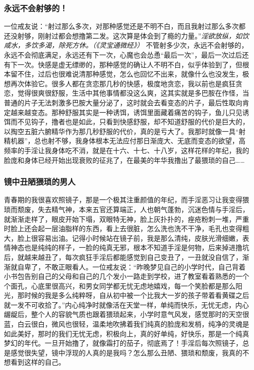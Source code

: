 \subsubsection{永远不会射够的！}

一位戒友说：“射过那么多次，对那种感觉还是不明不白，而且我射过那么多次都还没射够，刚射过都会想撸第二发。这次算是体会到了瘾的力量。”\textit{淫欲放纵，如饮咸水，多饮多渴，除死方休。（《灵宝通微经》）} 不管射多少次，永远不会射够的，永远不会彻底满足，永远还有下一次，心魔也会怂恿“最后一次”，最后一次过后还有下一次。快感是虚无缥缈的，那种感觉的确让人不明不白，似乎体验到了，但根本留不住，过后也很难说清那种感觉，怎么也回忆不出来，就像什么也没发生，极想再次体验它。很多人都在贪恋那几秒的快感，极度地贪恋，我以前也是疯狂贪恋，觉得很爽很舒服，生活中其他事情都没这么爽，这其实就是多巴胺在作怪，当普通的片子无法刺激多巴胺大量分泌了，这时就会去看变态的片子，最后性取向肯定越来越变态。那种舒服其实是一种诱饵，诱饵里面藏着痛苦的钩子，鱼儿只见诱饵而不见钩子，撸者也是如此，只看到快感舒服，却不知道舒服的代价是巨大的，以掏空五脏六腑精华作为那几秒舒服的代价，真的是亏大了。我那时就像一具“射精机器”，总也射不够，我身体根本无法应付那日渐庞大、无底而变态的欲望，高频率的手淫让我身体吃不消，就是在十六、十七、十八岁，这样花样的年纪，我的脸庞和身体已经开始出现衰败的征兆了，在最美的年华我撸出了最猥琐的自己……

\subsubsection{镜中丑陋猥琐的男人}

青春期的我很喜欢照镜子，那是一个极其注重颜值的年纪，而手淫恶习让我变得猥琐而颓废，失去精气神，本来五官还算端正，人也朝气蓬勃，沉迷色情与手淫后，就渐渐走样了，眼皮开始下塌，双眼特无神，脸上灰扑扑的，痤疮粉刺一堆，严重时脸上还会起一层油脂样的东西，看上去很脏，怎么洗也洗不干净，毛孔也变得粗大，脸上很容易出油。记得小时候站在镜子前，我是那么清纯，皮肤光滑细嫩，表情神态也是纯纯的样子，一脸的纯真无邪，根本不知道手淫是何物，后来掉进撸坑后，就越来越丑了，每次疯狂手淫后都能感觉到自己变丑了，一丑就没自信了，渐渐就自卑了，不敢正眼看人。一位戒友说：“昨晚梦见自己的小学时代，自己背着小书包告别自己的父母和自己的几个发小一路走到学校，进了教室看着熟悉的一个个面孔，心底里很高兴，和男女同学都无忧无虑地嬉戏，每一个笑脸都是那么阳光，那时候的我是多么纯粹呀，自从初中被一个比我大一岁的孩子带着看黄碟之后就一发不可收拾了。”内心纯净时就像活在天堂一样，单纯而快乐，无忧无虑，内心龌龊后，整个人的容貌气质也跟着猥琐起来，小学时意气风发，感觉那时的天空很蓝，白云很白，微风也很轻，温柔地吹拂着我们纯真的脸庞和发梢，纯净的灵魂是如此美好，那时的我们无忧无虑，积极向上，真的好单纯，好快乐，那是一个纯真梦幻的年代。一旦开始撸了，就像霜打的茄子，彻底焉了！手淫后每次照镜子，总是感觉很失望，镜中浮现的人真的是我吗？怎么那么丑陋、猥琐和颓废，我真的不想看到这样的自己。

